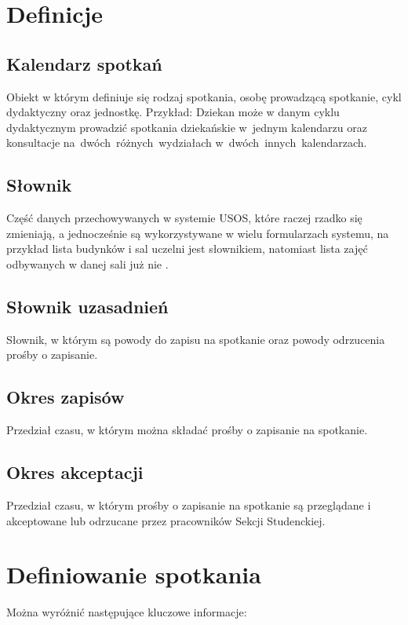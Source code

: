\documentclass[licencjacka]{pracamgr}
\begin{document}
\section{Definicje}
\subsection{Kalendarz spotkań}
Obiekt w którym definiuje się rodzaj spotkania, osobę prowadzącą spotkanie, cykl dydaktyczny oraz jednostkę. Przykład: Dziekan może w danym cyklu dydaktycznym prowadzić spotkania dziekańskie w~jednym kalendarzu oraz konsultacje na~dwóch~różnych~wydziałach w~dwóch~innych~kalendarzach.

\subsection{Słownik}
Część danych  przechowywanych  w  systemie  USOS, które  raczej  rzadko się zmieniają, a  jednocześnie są wykorzystywane w wielu formularzach systemu, na przykład lista budynków i sal uczelni jest słownikiem, natomiast lista zajęć odbywanych w danej sali już nie \cite{prz}.

\subsection{Słownik uzasadnień}
Słownik, w którym są powody do zapisu na spotkanie oraz powody odrzucenia prośby o zapisanie.

\subsection{Okres zapisów}
Przedział czasu, w którym można składać prośby o zapisanie na spotkanie.

\subsection{Okres akceptacji}
Przedział czasu, w którym prośby o zapisanie na spotkanie są przeglądane i akceptowane lub odrzucane przez pracowników Sekcji Studenckiej.


\section{Definiowanie spotkania}
Można wyróżnić następujące kluczowe informacje:
\end{document}
